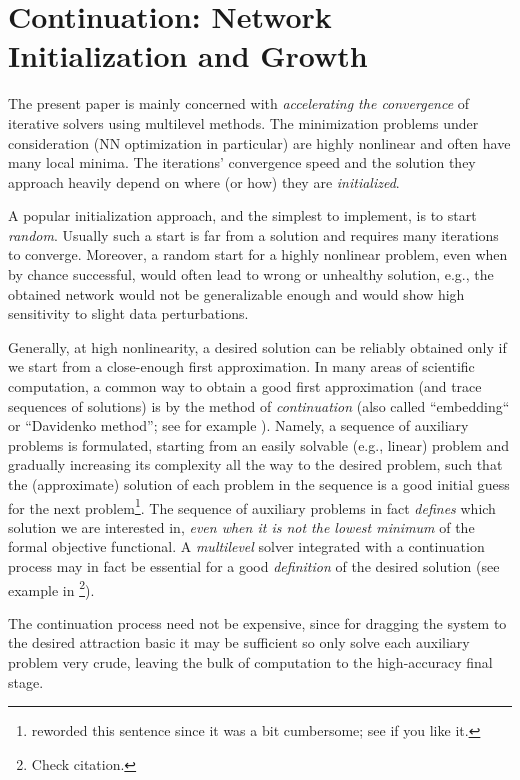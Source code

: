 \documentclass{article} %
\begin{document}
\section{Continuation: Network Initialization and Growth}
\label{sec:h}
The present paper is mainly concerned with {\it accelerating the convergence} of iterative solvers using multilevel methods. The minimization problems under consideration (NN optimization in particular) are highly nonlinear and often have many local minima. The iterations' convergence speed and the solution they approach heavily depend on where (or how) they are {\it initialized}.

A popular initialization approach, and the simplest to implement, is to start {\it random}. Usually such a start is far from a solution and requires many iterations to converge. Moreover, a random start for a highly nonlinear problem, even when by chance successful, would often lead to wrong or unhealthy solution, e.g., the obtained network would not be generalizable enough and would show high sensitivity to slight data perturbations.

Generally, at high nonlinearity, a desired solution can be reliably obtained only if we start from a close-enough first approximation. In many areas of scientific computation, a common way to obtain a good first approximation (and trace sequences of solutions) is by the method of {\it continuation} (also called ``embedding`` or ``Davidenko method''; see for example \cite{keller77}). Namely, a sequence of auxiliary problems is formulated, starting from an easily solvable (e.g., linear) problem and gradually increasing its complexity all the way to the desired problem, such that the (approximate) solution of each problem in the sequence is a good initial guess for the next problem\footnote{reworded this sentence since it was a bit cumbersome; see if you like it.}. The sequence of auxiliary problems in fact {\it defines} which solution we are interested in, {\it even when it is not the lowest minimum} of the formal objective functional. A {\it multilevel} solver integrated with a continuation process may in fact be essential for a good {\it definition} of the desired solution (see example in \cite{RSB}\footnote{Check citation.}).

The continuation process need not be expensive, since for dragging the system to the desired attraction basic it may be sufficient so only solve each auxiliary problem very crude, leaving the bulk of computation to the high-accuracy final stage.
\end{document}
